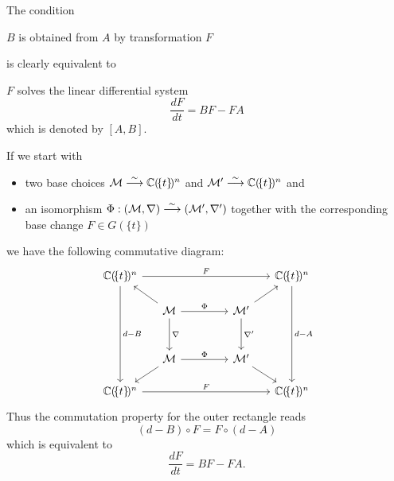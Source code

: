 \begin{rem}
  The condition
  \begin{einr}
    $B$ is obtained from $A$ by transformation $F$
  \end{einr}
  is clearly equivalent to
  \begin{einr}
    $F$ solves the linear differential system
    \[
      \frac{dF}{dt}=BF-FA
    \]
    which is denoted by $[A,B]$.
  \end{einr}
  \begin{s-rem}
    If we start with
    \begin{itemize}
      \item two base choices $\mathcal{M}\overset{\sim}\longrightarrow\mathbb{C}(\!\{t\}\!)^n$
        and $\mathcal{M}'\overset{\sim}\longrightarrow\mathbb{C}(\!\{t\}\!)^n$ and
      \item an isomorphism
        $\Phi:(\mathcal{M},\nabla)\overset{\sim}\longrightarrow(\mathcal{M}',\nabla')$ together
        with the corresponding base change $F\in G(\!\{t\}\!)$
    \end{itemize}
    we have the following commutative diagram:
    \[ \begin{tikzcd}[column sep=.5cm,row sep=.5cm]
        \C(\!\{t\}\!)^n \arrow{rrrrr}{F}\arrow{dddd}{d-B}&&&&&
          \C(\!\{t\}\!)^n\arrow{dddd}{d-A}
          \\ & \cM \arrow{dd}{\nabla}\arrow{rrr}{\Phi}\ular&&&
          \cM'\arrow{dd}{\nabla'}\urar
          \\
        \\ & \cM \arrow{rrr}{\Phi}\dlar&&& \cM'\drar
        \\ \C(\!\{t\}\!)^n \arrow{rrrrr}{F}&&&&& \C(\!\{t\}\!)^n
    \end{tikzcd} \]
    Thus the commutation property for the outer rectangle reads
    \[
      (d-B)\circ F=F\circ(d-A)
    \]
    which is equivalent \PROBLEM[really] to
    \[
      \frac{dF}{dt}=BF-FA.
    \]
    \begin{comment}
      \begin{align*}
        ((d-B)\circ F) x &= (F\circ(d-A)) x
      \\(d\circ F) x - (B\circ F) x &= F(dx -Ax)
      \\d(Fx) - B(Fx) &= F(x' - Ax)
      \\(F'x)x' - BFx &= Fx' - FAx
      \\(F'x)x' - Fx' &= BFx - FAx
      \\(F'x)x' - Fx' &= (BF - FA)x
      \\&~\!~\vdots
      \\F'x &= (BF - FA)x
      \end{align*}
    \end{comment}
  \end{s-rem}
\end{rem}
